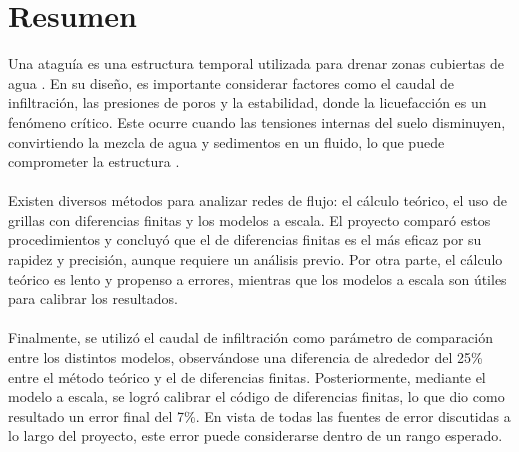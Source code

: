 \section*{Resumen}
Una ataguía es una estructura temporal utilizada para drenar zonas cubiertas de agua 
\citep{madanayaka2018}. En su diseño, es importante considerar factores como 
el caudal de infiltración, las presiones de poros y la estabilidad, donde la licuefacción
 es un fenómeno crítico. Este ocurre cuando las tensiones internas del suelo disminuyen,
  convirtiendo la mezcla de agua y sedimentos en un fluido, lo que puede comprometer 
  la estructura \citep{sumer2009}.
\\ \\
Existen diversos métodos para analizar redes de flujo: el cálculo teórico, 
el uso de grillas con diferencias finitas y los modelos a escala. El proyecto 
comparó estos procedimientos y concluyó que el de diferencias finitas es el más eficaz
 por su rapidez y precisión, aunque requiere un análisis previo. Por otra parte, el cálculo teórico es 
 lento y propenso a errores, mientras que los modelos a escala son útiles para calibrar 
 los resultados.
\\ \\
Finalmente, se utilizó el caudal de infiltración como parámetro de comparación entre los 
distintos modelos, observándose una diferencia de alrededor del 25\% entre el método
 teórico y el de diferencias finitas. Posteriormente, mediante el modelo a escala,
  se logró calibrar el código de diferencias finitas, lo que dio como resultado un error final del 
  7\%. En vista de todas las fuentes de error discutidas a lo largo del proyecto, 
  este error puede considerarse dentro de un rango esperado.
